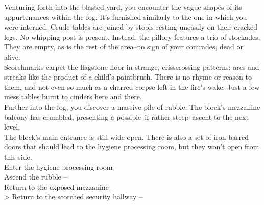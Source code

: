Venturing forth into the blasted yard, you encounter the vague shapes of its appurtenances within the fog. It’s furnished similarly to the one in which you were interned. Crude tables are joined by stools resting uneasily on their cracked legs. No whipping post is present. Instead, the pillory features a trio of stockades. They are empty, as is the rest of the area--no sign of your comrades, dead or alive.\\

Scorchmarks carpet the flagstone floor in strange, crisscrossing patterns: arcs and streaks like the product of a child’s paintbrush. There is no rhyme or reason to them, and not even so much as a charred corpse left in the fire’s wake. Just a few mess tables burnt to cinders here and there.\\

Further into the fog, you discover a massive pile of rubble. The block's mezzanine balcony has crumbled, presenting a possible--if rather steep--ascent to the next level.\\

The block’s main entrance is still wide open. There is also a set of iron-barred doors that should lead to the hygiene processing room, but they won’t open from this side.\\

 Enter the hygiene processing room -- \\
 Ascend the rubble -- \\
 Return to the exposed mezzanine -- \\
> Return to the scorched security hallway -- 